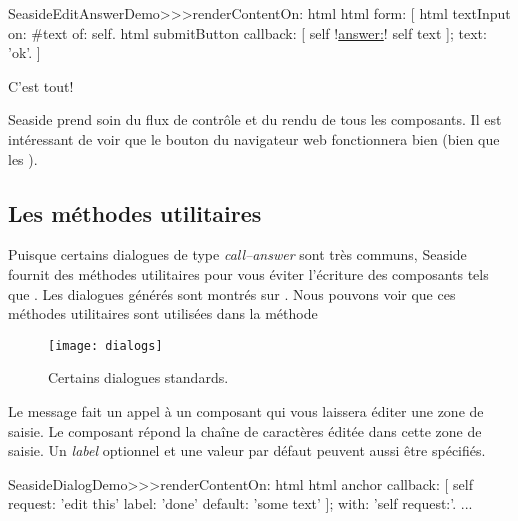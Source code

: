 \documentclass[a4paper,10pt,twoside]{book}
\begin{document}
\begin{code}{}
SeasideEditAnswerDemo>>>renderContentOn: html
	html form: [
		html textInput
			on: #text of: self.
		html submitButton
			callback: [ self !\underline{answer:}! self text ];
			text: 'ok'.
		]
\end{code}{}

C'est tout!

Seaside prend soin du flux de contrôle et du rendu de tous les
composants.
Il est intéressant de voir que le bouton \backbtn{} du navigateur web
fonctionnera bien (bien que les ).

\subsection{Les méthodes utilitaires}

Puisque certains dialogues de type \emph{call--answer} sont très
communs, Seaside fournit des méthodes utilitaires pour vous éviter
l'écriture des composants tels que .
Les dialogues générés sont montrés sur .
Nous pouvons voir que ces méthodes utilitaires sont utilisées dans la
méthode 

\begin{figure}[b]
\begin{center}
\texttt{[image: dialogs]}
\caption{Certains dialogues standards.}
\end{center}
\end{figure}

Le message  fait un appel à un composant
qui vous laissera éditer une zone de saisie. Le composant répond la
chaîne de caractères éditée
dans cette zone de saisie.
Un \emph{label} optionnel et une valeur par défaut peuvent aussi être
spécifiés.

\begin{code}{}
SeasideDialogDemo>>>renderContentOn: html
	html anchor
		callback: [ self request: 'edit this' label: 'done' default: 'some text' ];
		with: 'self request:'.
...
\end{code}
\end{document}
